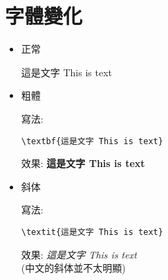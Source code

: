 \section{字體變化}

\begin{itemize}
  \item
  {
    正常

    這是文字 This is text
  } %

  \item
  {
    粗體

    寫法:
    \begin{framed}
    \verb|\textbf{這是文字 This is text}|
    \end{framed}

    效果: \textbf{這是文字 This is text}
  } %

  \item
  {
    斜体

    寫法:
    \begin{framed}
    \verb|\textit{這是文字 This is text}|
    \end{framed}

    效果: \textit{這是文字 This is text}\\
    (中文的斜体並不太明顯)
  } %
\end{itemize}
